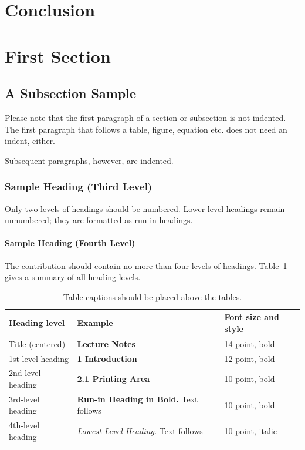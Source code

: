 \documentclass[runningheads]{llncs}
\begin{document}
\section{Conclusion}

\section{First Section}
\subsection{A Subsection Sample}
Please note that the first paragraph of a section or subsection is
not indented. The first paragraph that follows a table, figure,
equation etc. does not need an indent, either.

Subsequent paragraphs, however, are indented.

\subsubsection{Sample Heading (Third Level)} Only two levels of
headings should be numbered. Lower level headings remain unnumbered;
they are formatted as run-in headings.

\paragraph{Sample Heading (Fourth Level)}
The contribution should contain no more than four levels of
headings. Table~\ref{tab1} gives a summary of all heading levels.

\begin{table}
\caption{Table captions should be placed above the
tables.}\label{tab1}
\begin{tabular}{|l|l|l|}
\hline
Heading level &  Example & Font size and style\\
\hline
Title (centered) &  {\Large\bfseries Lecture Notes} & 14 point, bold\\
1st-level heading &  {\large\bfseries 1 Introduction} & 12 point, bold\\
2nd-level heading & {\bfseries 2.1 Printing Area} & 10 point, bold\\
3rd-level heading & {\bfseries Run-in Heading in Bold.} Text follows & 10 point, bold\\
4th-level heading & {\itshape Lowest Level Heading.} Text follows & 10 point, italic\\
\hline
\end{tabular}
\end{table}
\end{document}
